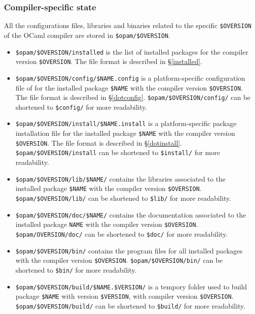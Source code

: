 \documentclass[a4paper,11pt]{article}
\begin{document}
\subsubsection{Compiler-specific state}

All the configurations files, libraries and binaries related to the
specific \verb+$OVERSION+ of the OCaml compiler are stored in
\verb+$opam/$OVERSION+.

\begin{itemize}

\item \verb+$opam/$OVERSION/installed+ is the list of installed
  packages for the compiler version \verb+$OVERSION+. The file format
  is described in \S\ref{installed}.

\item \verb+$opam/$OVERSION/config/$NAME.config+ is a
  platform-specific configuration file of for the installed package
  \verb+$NAME+ with the compiler version \verb+$OVERSION+. The file
  format is described in \S\ref{dotconfig}.
  \verb+$opam/$OVERSION/config/+ can be shortened to \verb+$config/+
  for more readability.

\item \verb+$opam/$OVERSION/install/$NAME.install+ is a
  platform-specific package installation file for the installed
  package \verb+$NAME+ with the compiler version \verb+$OVERSION+. The
  file format is described in \S\ref{dotinstall}.
  \verb+$opam/$OVERSION/install+ can be shortened to \verb+$install/+
  for more readability.

\item \verb+$opam/$OVERSION/lib/$NAME/+ contains the libraries
  associated to the installed package \verb+$NAME+ with the compiler
  version \verb+$OVERSION+. \verb+$opam/$OVERSION/lib/+ can be
  shortened to \verb+$lib/+ for more readability.

\item \verb+$opam/$OVERSION/doc/$NAME/+ contains the documentation
  associated to the installed package {\tt NAME} with the compiler
  version \verb+$OVERSION+. \verb+$opam/OVERSION/doc/+ can be
  shortened to \verb+$doc/+ for more readability.

\item \verb+$opam/$OVERSION/bin/+ contains the program files for all
  installed packages with the compiler version
  \verb+$OVERSION+. \verb+$opam/$OVERSION/bin/+ can be shortened to
  \verb+$bin/+ for more readability.

\item \verb+$opam/$OVERSION/build/$NAME.$VERSION/+ is a tempory folder
  used to build package \verb+$NAME+ with version \verb+$VERSION+,
  with compiler version \verb+$OVERSION+. \verb+$opam/$OVERSION/build/+
  can be shortened to \verb+$build/+ for more readability.


\end{itemize}
\end{document}
